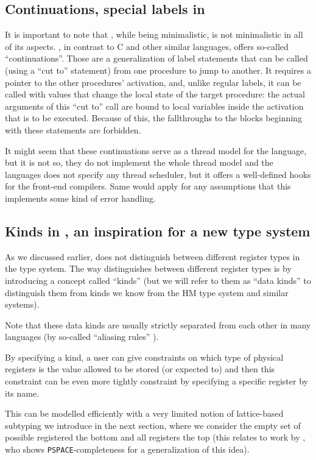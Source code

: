 \subsection{Continuations, special labels in \cmm{}}

It is important to note that \cmm{}, while being minimalistic, is not minimalistic in all of its aspects. \cmm{}, in contrast to C and other similar languages, offers so-called ``continuations''. Those are a generalization of label statements that can be called (using a ``cut to'' statement) from one procedure to jump to another. It requires a pointer to the other procedures' activation, and, unlike regular labels, it can be called with values that change the local state of the target procedure: the actual arguments of this ``cut to'' call are bound to local variables inside the activation that is to be executed. Because of this, the fallthroughs to the blocks beginning with these statements are forbidden.

It might seem that these continuations serve as a thread model for the language, but it is not so, they do not implement the whole thread model and the languages does not specify any thread scheduler, but it offers a well-defined hooks for the front-end compilers. Same would apply for any assumptions that this implements some kind of error handling. \cite{ramsey2005c}

\subsection{Kinds in \cmm{}, an inspiration for a new type system}

As we discussed earlier, \cmm{} does not distinguish between different register types in the type system. The way \cmm{} distinguishes between different register types is by introducing a concept called ``kinds'' (but we will refer to them as ``data kinds'' to distinguish them from kinds we know from the HM type system and similar systems).

Note that these data kinds are usually strictly separated from each other in many languages (by so-called ``aliasing rules'' \cite{cstandard2018}).

By specifying a kind, a user can give constraints on which type of physical registers is the value allowed to be stored (or expected to) and then this constraint can be even more tightly constraint by specifying a specific register by its name.

This can be modelled efficiently with a very limited notion of lattice-based subtyping we introduce in the next section, where we consider the empty set of possible registered the bottom and all registers the top (this relates to work by \citet{tiuryn1999subtyping}, who shows \texttt{PSPACE}-completeness for a generalization of this idea).

